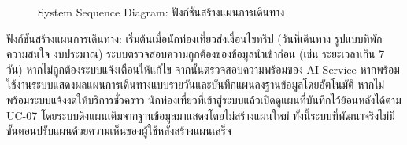 \begin{figure}[H]
\centering
{}
\caption{System Sequence Diagram: ฟังก์ชันสร้างแผนการเดินทาง}
\label{fig:ssd_tourist_trip}
\end{figure}

ฟังก์ชันสร้างแผนการเดินทาง: เริ่มต้นเมื่อนักท่องเที่ยวส่งเงื่อนไขทริป (วันที่เดินทาง รูปแบบที่พัก ความสนใจ งบประมาณ) ระบบตรวจสอบความถูกต้องของข้อมูลนำเข้าก่อน (เช่น ระยะเวลาเกิน 7 วัน) หากไม่ถูกต้องระบบแจ้งเตือนให้แก้ไข จากนั้นตรวจสอบความพร้อมของ AI Service หากพร้อมใช้งานระบบแสดงผลแผนการเดินทางแบบรายวันและบันทึกแผนลงฐานข้อมูลโดยอัตโนมัติ หากไม่พร้อมระบบแจ้งงดให้บริการชั่วคราว นักท่องเที่ยวที่เข้าสู่ระบบแล้วเปิดดูแผนที่บันทึกไว้ย้อนหลังได้ตาม UC-07 โดยระบบดึงแผนเดิมจากฐานข้อมูลมาแสดงโดยไม่สร้างแผนใหม่ ทั้งนี้ระบบที่พัฒนาจริงไม่มีขั้นตอนปรับแผนด้วยความเห็นของผู้ใช้หลังสร้างแผนเสร็จ

